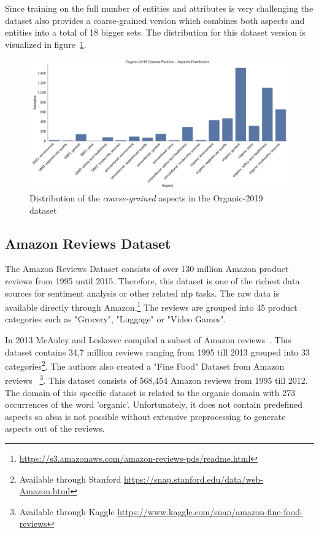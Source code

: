 Since training on the full number of entities and attributes is very challenging the dataset also provides a coarse-grained version which combines both aspects and entities into a total of 18 bigger sets. The distribution for this dataset version is visualized in figure~\ref{fig:05_organic2019_coarse}.

\begin{figure}[ht]
    \centering
    \includegraphics[width=\textwidth]{figures/05_setup/05_organicCoarseGrained}
    \caption{Distribution of the \textit{coarse-grained} aspects in the Organic-2019 dataset}
    \label{fig:05_organic2019_coarse}
\end{figure}

\subsection{Amazon Reviews Dataset}
\label{sec:05_amazonReviews}
The Amazon Reviews Dataset consists of over 130 million Amazon product reviews from 1995 until 2015. Therefore, this dataset is one of the richest data sources for sentiment analysis or other related \gls{nlp} tasks. The raw data is available directly through Amazon.\footnote{\url{https://s3.amazonaws.com/amazon-reviews-pds/readme.html}} The reviews are grouped into 45 product categories such as "Grocery", "Luggage" or "Video Games". 
\medskip

In 2013 McAuley and Leskovec compiled a subset of Amazon reviews~\cite{McAuley2013}. This dataset contains 34,7 million reviews ranging from 1995 till 2013 grouped into 33 categories\footnote{Available through Stanford \url{https://snap.stanford.edu/data/web-Amazon.html}}. The authors also created a "Fine Food" Dataset from Amazon reviews~\cite{McAuley2013a} \footnote{Available through Kaggle \url{https://www.kaggle.com/snap/amazon-fine-food-reviews}}. This dataset consists of 568,454 Amazon reviews from 1995 till 2012. The domain of this specific dataset is related to the organic domain with 273 occurrences of the word 'organic'. Unfortunately, it does not contain predefined aspects so \gls{absa} is not possible without extensive preprocessing to generate aspects out of the reviews.
\medskip

